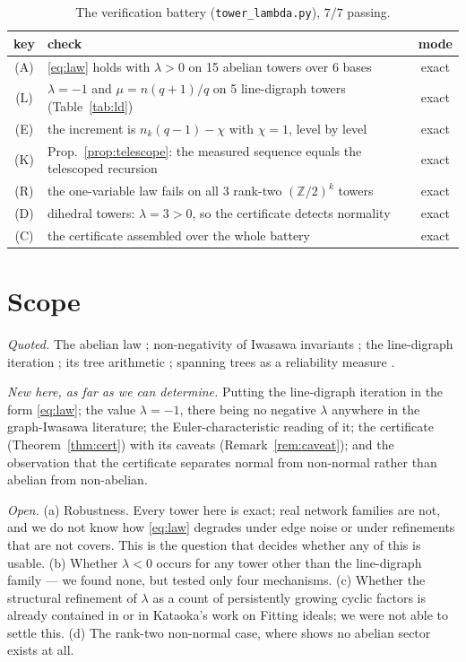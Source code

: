 \documentclass[11pt]{article}
\theoremstyle{plain}
\theoremstyle{remark}
\newcommand{\Z}{\mathbb{Z}}
\begin{document}
\begin{table}[ht]
\centering\small
\begin{tabular}{clc}
\toprule
key & check & mode\\
\midrule
(A) & \eqref{eq:law} holds with $\lambda>0$ on 15 abelian towers over 6 bases & exact\\
(L) & $\lambda=-1$ and $\mu=n(q{+}1)/q$ on 5 line-digraph towers (Table~\ref{tab:ld}) & exact\\
(E) & the increment is $n_k(q-1)-\chi$ with $\chi=1$, level by level & exact\\
(K) & Prop.~\ref{prop:telescope}: the measured sequence equals the telescoped recursion & exact\\
(R) & the one-variable law fails on all 3 rank-two $(\Z/2)^{k}$ towers & exact\\
(D) & dihedral towers: $\lambda=3>0$, so the certificate detects normality & exact\\
(C) & the certificate assembled over the whole battery & exact\\
\bottomrule
\end{tabular}
\caption{The verification battery (\texttt{tower\_lambda.py}), $7/7$ passing.}
\label{tab:battery}
\end{table}

\section{Scope}\label{sec:scope}

\emph{Quoted.} The abelian law \cite{Val21,MV24,Gonet22,KM24}; non-negativity of Iwasawa
invariants \cite{Washington}; the line-digraph iteration \cite{FAY83,FYA84}; its
tree arithmetic \cite{Knuth67,Levine11,BK11,CHP15}; spanning trees as a reliability measure
\cite{Boesch86,Colbourn87,BH09}.

\emph{New here, as far as we can determine.} Putting the line-digraph iteration in the form
\eqref{eq:law}; the value $\lambda=-1$, there being no negative $\lambda$ anywhere in the
graph-Iwasawa literature; the Euler-characteristic reading of it; the certificate
(Theorem~\ref{thm:cert}) with its caveats (Remark~\ref{rem:caveat}); and the observation
that the certificate separates normal from non-normal rather than abelian from non-abelian.

\emph{Open.} (a) Robustness. Every tower here is exact; real network families are not, and
we do not know how \eqref{eq:law} degrades under edge noise or under refinements that are
not covers. This is the question that decides whether any of this is usable. (b) Whether
$\lambda<0$ occurs for any tower other than the line-digraph family --- we found none, but
tested only four mechanisms. (c) Whether the structural refinement of $\lambda$ as a count
of persistently growing cyclic factors is already contained in \cite{Gonet22} or in
Kataoka's work on Fitting ideals; we were not able to settle this. (d) The rank-two
non-normal case, where \cite[X--XII]{ANCFT} shows no abelian sector exists at all.
\end{document}
